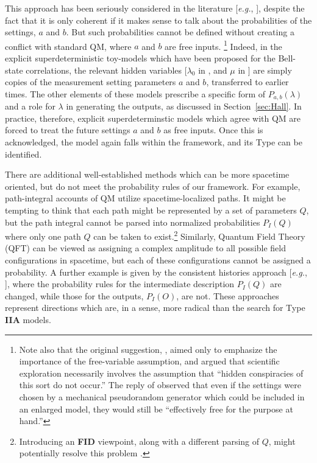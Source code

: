 \documentclass[rmp, aps, preprint, longbibliography]{revtex4-1}
\begin{document}
This approach has been seriously considered in the literature [\emph{e.g.}, \textcite{thooft2016}], despite the fact that it is only coherent if it makes sense to talk about the probabilities of the settings, $a$ and $b$.  But such probabilities cannot be defined without creating a conflict with standard QM, where $a$ and $b$ are free inputs.%
\footnote{Note also that the original suggestion, \textcite{shimony1976}, aimed only to emphasize the importance of the free-variable assumption, and argued that scientific exploration necessarily involves the assumption that ``hidden conspiracies of this sort do not occur.''  The reply of \textcite{bell1977} observed that even if the settings were chosen by a mechanical pseudorandom generator which could be included in an enlarged model, they would still be ``effectively free for the purpose at hand.''}
Indeed, in the explicit superdeterministic toy-models which have been proposed for the Bell-state correlations, the relevant hidden variables [$\lambda_0$ in \textcite{brans1988}, and $\mu$ in \textcite{hall2016}] are simply copies of the measurement setting parameters $a$ and $b$, transferred to earlier times.  The other elements of these models prescribe a specific form of $P_{a,b}(\lambda)$ and a role for $\lambda$ in generating the outputs, as discussed in Section~\ref{sec:Hall}.  In practice, therefore, explicit superdeterminstic models which agree with QM are forced to treat the future settings $a$ and $b$ as free inputs.  Once this is acknowledged, the model again falls within the framework, and its Type can be identified.

There are additional well-established methods which can be more spacetime oriented, but do not meet the probability rules of our framework.  For example, path-integral accounts of QM utilize spacetime-localized paths.  It might be tempting to think that each path might be represented by a set of parameters $Q$, but the path integral cannot be parsed into normalized probabilities $P_I(Q)$ where only one path $Q$ can be taken to exist.\footnote{Introducing an {\bf FID} viewpoint, along with a different parsing of $Q$, might potentially resolve this problem \cite{wharton2016}.}  Similarly, Quantum Field Theory (QFT) can be viewed as assigning a complex amplitude to all possible field configurations in spacetime, but each of these configurations cannot be assigned a probability.  A further example is given by the consistent histories approach [\emph{e.g.}, \textcite{griffiths2011}], where the probability rules for the intermediate description $P_I(Q)$ are changed, while those for the outputs, $P_I(O)$, are not.  These approaches represent directions which are, in a sense, more radical than the search for Type {\bf IIA} models.
\end{document}
